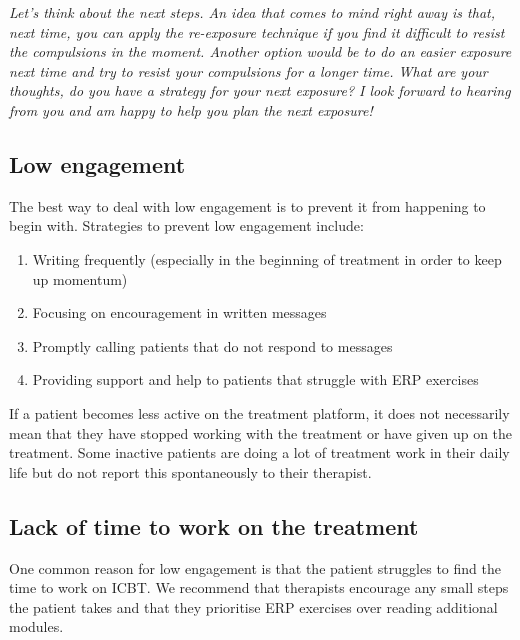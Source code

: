 \documentclass[]{book}
\providecommand{\tightlist}{%
  \setlength{\itemsep}{0pt}\setlength{\parskip}{0pt}}
\begin{document}
\emph{Let's think about the next steps. An idea that comes to mind right away is that, next time, you can apply the re-exposure technique if you find it difficult to resist the compulsions in the moment. Another option would be to do an easier exposure next time and try to resist your compulsions for a longer time. What are your thoughts, do you have a strategy for your next exposure? I look forward to hearing from you and am happy to help you plan the next exposure!}

\hypertarget{low-engagement}{%
\subsection{Low engagement}\label{low-engagement}}

The best way to deal with low engagement is to prevent it from happening to begin with. Strategies to prevent low engagement include:

\begin{enumerate}
\def\labelenumi{\arabic{enumi}.}
\tightlist
\item
  Writing frequently (especially in the beginning of treatment in order to keep up momentum)
\item
  Focusing on encouragement in written messages
\item
  Promptly calling patients that do not respond to messages
\item
  Providing support and help to patients that struggle with ERP exercises
\end{enumerate}

If a patient becomes less active on the treatment platform, it does not necessarily mean that they have stopped working with the treatment or have given up on the treatment. Some inactive patients are doing a lot of treatment work in their daily life but do not report this spontaneously to their therapist.

\hypertarget{lack-of-time-to-work-on-the-treatment}{%
\subsection{Lack of time to work on the treatment}\label{lack-of-time-to-work-on-the-treatment}}

One common reason for low engagement is that the patient struggles to find the time to work on ICBT. We recommend that therapists encourage any small steps the patient takes and that they prioritise ERP exercises over reading additional modules.
\end{document}
